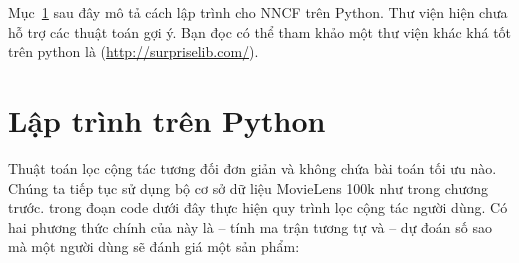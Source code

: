 Mục~\ref{sec:24_python} sau đây mô tả cách lập trình cho NNCF trên
Python. Thư viện  hiện chưa hỗ trợ các thuật toán gợi ý. Bạn đọc có thể tham khảo một thư viện khác khá tốt trên python là  (\url{http://surpriselib.com/}).
 
\section{Lập trình trên Python }
\label{sec:24_python}
Thuật toán lọc cộng tác tương đối đơn giản và không
chứa bài toán tối ưu nào. Chúng ta tiếp tục sử dụng bộ cơ sở dữ liệu MovieLens
100k như trong chương trước.  trong đoạn code dưới đây thực hiện quy trình lọc cộng tác người dùng. Có hai phương thức chính của
 này là  -- tính ma trận tương tự và
 -- dự đoán số sao mà một người dùng sẽ đánh giá một
sản phẩm:
 \newpage 
